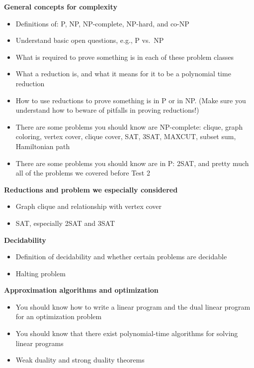 \documentclass[11  pt]{exam}
\begin{document}
\textbf{General concepts for complexity}
\begin{itemize}
	\item Definitions of: P, NP, NP-complete, NP-hard, and co-NP
	\item Understand basic open questions, e.g., P vs.\ NP
	\item What is required to prove something is in each of these problem classes
	\item What a reduction is, and what it means for it to be a polynomial time reduction
	\item How to use reductions to prove something is in P or in NP. (Make sure you understand how to beware of pitfalls in proving reductions!)
	\item There are some problems you should know are NP-complete: clique, graph coloring, vertex cover, clique cover, SAT, 3SAT, MAXCUT, subset sum, Hamiltonian path
	\item There are some problems you should know are in P: 2SAT, and pretty much all of the problems we covered before Test 2
\end{itemize}

\textbf{Reductions and problem we especially considered}
\begin{itemize}
	\item Graph clique and relationship with vertex cover
	\item SAT, especially 2SAT and 3SAT
\end{itemize}

\textbf{Decidability}
\begin{itemize}
	\item Definition of decidability and whether certain problems are decidable
	\item Halting problem
\end{itemize}

\textbf{Approximation algorithms and optimization}
\begin{itemize}
	\item You should know how to write a linear program and the dual linear program for an optimization problem
	\item You should know that there exist polynomial-time algorithms for solving linear programs
	\item Weak duality and strong duality theorems
\end{itemize}
\end{document}

